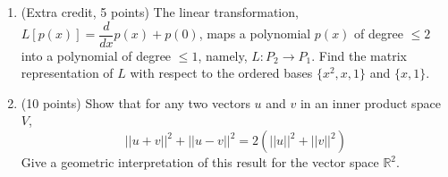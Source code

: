 \documentclass[fleqn]{article}
\begin{document}
\begin{enumerate}
    \item (Extra credit, 5 points) The linear transformation, $L \left[p(x)\right]=\dfrac{d}{dx}p(x)+p(0)$, maps 
    a polynomial $p(x)$ of degree $\leq 2$  into a polynomial of degree $\leq 1$, namely, $L: P_2 \rightarrow P_1$.
    Find the matrix representation of $L$ with respect to the ordered bases $\{ x^2, x, 1\}$ and $\{ x, 1\}$.

          

    \item (10 points) Show that for any two vectors $u$ and $v$ in an inner product space $V$,
    $$||u+v||^2+||u-v||^2=2\left(||u||^2+||v||^2\right)$$
    Give a geometric interpretation of this result for the vector space $\mathbb{R}^2$.


\end{enumerate}
\end{document}
